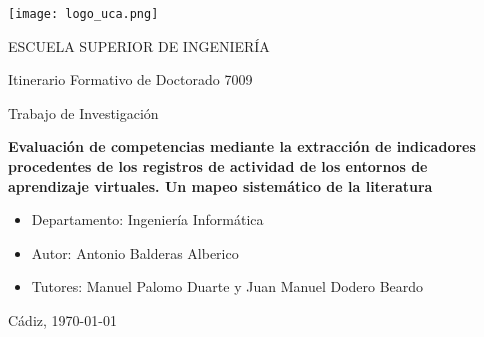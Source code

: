 

\begin{center}

  \texttt{[image: logo\_uca.png]} \\

  \vspace{2.0cm}

  \Large{ESCUELA SUPERIOR DE INGENIERÍA} \\

  \vspace{1.0cm}

  \large{Itinerario Formativo de Doctorado 7009} \\

  \vspace{2.0cm}

  \large{Trabajo de Investigación} \\

  \vspace{1.0cm}

  \Large{\textbf{Evaluación de competencias mediante la extracción de indicadores procedentes de los registros de actividad de los entornos de aprendizaje virtuales. Un mapeo sistemático de la literatura}} \\
    
  \vspace{3.0cm}

\end{center}

\begin{itemize}
\item \large{Departamento: Ingeniería Informática}
\item \large{Autor: Antonio Balderas Alberico}
\item \large{Tutores: Manuel Palomo Duarte y Juan Manuel Dodero Beardo}
\end{itemize}

\vspace{1.0cm}

\begin{flushright}
  \large{Cádiz, \today} \\

\end{flushright}
